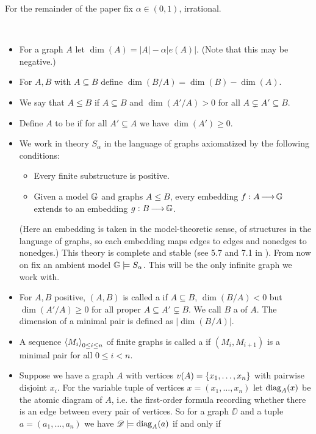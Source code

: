 \documentclass{amsart}
\begin{document}
For the remainder of the paper fix $\alpha \in (0,1)$, irrational.
\begin{Definition} \ 
  \begin{itemize}
  \item For a graph $A$ let $\dim(A) = |A| - \alpha |e(A)|$. (Note that this may be negative.)
  \item For $A,B$ with $A \subseteq B$ define $\dim(B/A) = \dim(B) - \dim(A)$.
  \item We say that $A \leq B$ if $A \subseteq B$ and $\dim(A'/A) > 0$ for all $A \subsetneq A' \subseteq B$.
  \item Define $A$ to be \defn{positive} if for all $A' \subseteq A$ we have $\dim(A') \geq 0$.
  \item We work in theory $S_\alpha$ in the language of graphs axiomatized by the following conditions:
    \begin{itemize}
    \item Every finite substructure is positive.
    \item Given a model $\mathbb G$ and graphs $A \leq B$, every embedding $f : A \operatorname{\longrightarrow} \mathbb G$ extends to an embedding $g: B \operatorname{\longrightarrow} \mathbb G$.
    \end{itemize}
    (Here an embedding is taken in the model-theoretic sense, of structures in the language of graphs, so each embedding
    maps edges to edges and nonedges to nonedges.)
    This theory is complete and stable (see 5.7 and 7.1 in \cite{laskowski}).
    From now on fix an ambient model $\mathbb G \models S_\alpha$.
    This will be the only infinite graph we work with.
  \item For $A, B$ positive, $(A, B)$ is called a  if
    $A \subseteq B$, $\dim(B/A) < 0$ but $\dim(A'/A) \geq 0$ for all proper $A \subseteq A' \subsetneq B$.
    We call $B$ a \defn{minimal extension} of $A$.
    The dimension of a minimal pair is defined as $|\dim(B/A)|$.
  \item A sequence $\left\langle M_i \right\rangle_{0 \leq i \leq n}$ of finite graphs is called a 
    if $(M_i, M_{i+1})$ is a minimal pair for all $0 \leq i < n$.
  \item Suppose we have a graph $A$ with vertices $v(A) = \left\{x_1, \ldots, x_n\right\}$ with pairwise disjoint $x_i$.
    For the variable tuple of vertices $x = (x_1, \ldots, x_n)$ let $\operatorname{diag}_A(x)$ be the atomic diagram of $A$,
    i.e. the first-order formula recording whether there is an edge between every pair of vertices.
    So for a graph $\DD$ and a tuple $a = (a_1, \ldots, a_n)$ we have $\mathscr D \models \operatorname{diag}_A(a)$ if and only if

\end{itemize}
\end{Definition}
\end{document}
